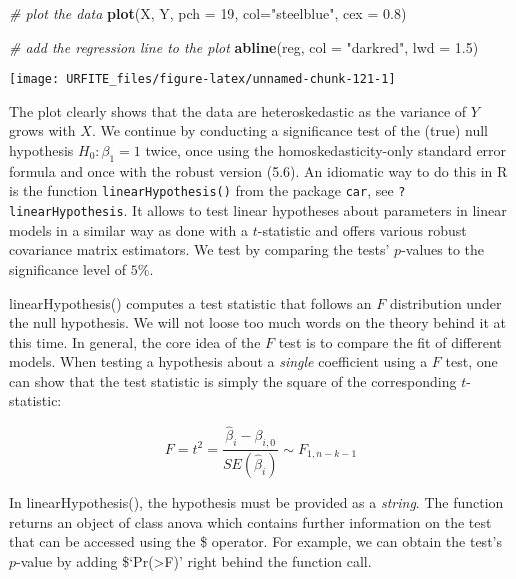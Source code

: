 \documentclass[]{book}
\newenvironment{Shaded}{\begin{snugshade}}{\end{snugshade}}
\newcommand{\KeywordTok}[1]{\textcolor[rgb]{0.13,0.29,0.53}{\textbf{#1}}}
\newcommand{\DataTypeTok}[1]{\textcolor[rgb]{0.13,0.29,0.53}{#1}}
\newcommand{\DecValTok}[1]{\textcolor[rgb]{0.00,0.00,0.81}{#1}}
\newcommand{\FloatTok}[1]{\textcolor[rgb]{0.00,0.00,0.81}{#1}}
\newcommand{\StringTok}[1]{\textcolor[rgb]{0.31,0.60,0.02}{#1}}
\newcommand{\CommentTok}[1]{\textcolor[rgb]{0.56,0.35,0.01}{\textit{#1}}}
\newcommand{\NormalTok}[1]{#1}
\theoremstyle{definition}
\theoremstyle{definition}
\theoremstyle{definition}
\theoremstyle{remark}
\let\BeginKnitrBlock\begin \let\EndKnitrBlock\end
\begin{document}
\begin{Shaded}
\begin{Highlighting}[]
\CommentTok{# plot the data}
\KeywordTok{plot}\NormalTok{(X, Y, }\DataTypeTok{pch =} \DecValTok{19}\NormalTok{, }\DataTypeTok{col=}\StringTok{"steelblue"}\NormalTok{, }\DataTypeTok{cex =} \FloatTok{0.8}\NormalTok{)}

\CommentTok{# add the regression line to the plot}
\KeywordTok{abline}\NormalTok{(reg, }\DataTypeTok{col =} \StringTok{"darkred"}\NormalTok{, }\DataTypeTok{lwd =} \FloatTok{1.5}\NormalTok{)}
\end{Highlighting}
\end{Shaded}

\begin{center}\texttt{[image: URFITE\_files/figure-latex/unnamed-chunk-121-1]} \end{center}

The plot clearly shows that the data are heteroskedastic as the variance
of \(Y\) grows with \(X\). We continue by conducting a significance test
of the (true) null hypothesis \(H_0: \beta_1 = 1\) twice, once using the
homoskedasticity-only standard error formula and once with the robust
version (5.6). An idiomatic way to do this in R is the function
\texttt{linearHypothesis()} from the package \texttt{car}, see
\texttt{?linearHypothesis}. It allows to test linear hypotheses about
parameters in linear models in a similar way as done with a
\(t\)-statistic and offers various robust covariance matrix estimators.
We test by comparing the tests' \(p\)-values to the significance level
of \(5\%\).

\BeginKnitrBlock{rmdknit}
linearHypothesis() computes a test statistic that follows an \(F\)
distribution under the null hypothesis. We will not loose too much words
on the theory behind it at this time. In general, the core idea of the
\(F\) test is to compare the fit of different models. When testing a
hypothesis about a \emph{single} coefficient using a \(F\) test, one can
show that the test statistic is simply the square of the corresponding
\(t\)-statistic:

\[ F = t^2 = \frac{\hat\beta_i - \beta_{i,0}}{SE(\hat\beta_i)} \sim F_{1,n-k-1}  \]

In linearHypothesis(), the hypothesis must be provided as a
\emph{string}. The function returns an object of class anova which
contains further information on the test that can be accessed using the
\$ operator. For example, we can obtain the test's \(p\)-value by adding
\$`Pr(\textgreater{}F)' right behind the function call.
\EndKnitrBlock{rmdknit}
\end{document}
